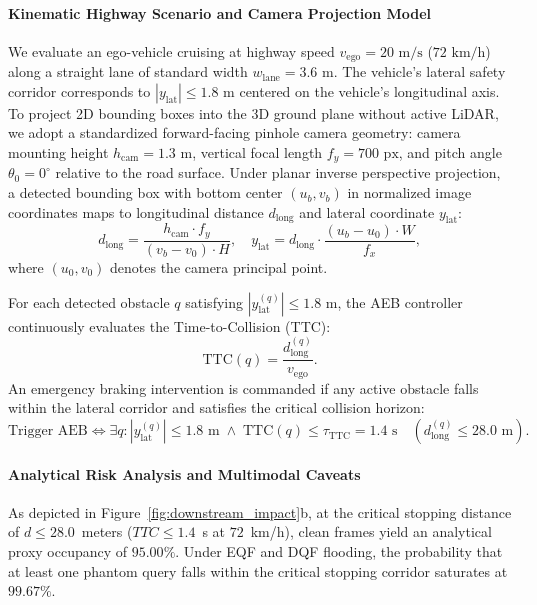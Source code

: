 \documentclass[preprint,12pt]{elsarticle}
\begin{document}
\paragraph{Kinematic Highway Scenario and Camera Projection Model}
We evaluate an ego-vehicle cruising at highway speed $v_{\mathrm{ego}} = 20\text{ m/s}$ ($72\text{ km/h}$) along a straight lane of standard width $w_{\mathrm{lane}} = 3.6\text{ m}$. The vehicle's lateral safety corridor corresponds to $|y_{\mathrm{lat}}| \le 1.8\text{ m}$ centered on the vehicle's longitudinal axis. To project 2D bounding boxes into the 3D ground plane without active LiDAR, we adopt a standardized forward-facing pinhole camera geometry: camera mounting height $h_{\mathrm{cam}} = 1.3\text{ m}$, vertical focal length $f_y = 700\text{ px}$, and pitch angle $\theta_0 = 0^\circ$ relative to the road surface. Under planar inverse perspective projection, a detected bounding box with bottom center $(u_b, v_b)$ in normalized image coordinates maps to longitudinal distance $d_{\mathrm{long}}$ and lateral coordinate $y_{\mathrm{lat}}$:
\begin{equation}
    d_{\mathrm{long}} = \frac{h_{\mathrm{cam}} \cdot f_y}{(v_b - v_0) \cdot H}, \quad y_{\mathrm{lat}} = d_{\mathrm{long}} \cdot \frac{(u_b - u_0) \cdot W}{f_x},
\end{equation}
where $(u_0, v_0)$ denotes the camera principal point.

For each detected obstacle $q$ satisfying $|y_{\mathrm{lat}}^{(q)}| \le 1.8\text{ m}$, the AEB controller continuously evaluates the Time-to-Collision (TTC):
\begin{equation}
    \mathrm{TTC}(q) = \frac{d_{\mathrm{long}}^{(q)}}{v_{\mathrm{ego}}}.
\end{equation}
An emergency braking intervention is commanded if any active obstacle falls within the lateral corridor and satisfies the critical collision horizon:
\begin{equation}
    \text{Trigger AEB} \iff \exists q : |y_{\mathrm{lat}}^{(q)}| \le 1.8\text{ m} \;\land\; \mathrm{TTC}(q) \le \tau_{\mathrm{TTC}} = 1.4\text{ s} \quad (d_{\mathrm{long}}^{(q)} \le 28.0\text{ m}).
\end{equation}

\paragraph{Analytical Risk Analysis and Multimodal Caveats}
As depicted in Figure~\ref{fig:downstream_impact}b, at the critical stopping distance of $d \le 28.0$~meters ($TTC \le 1.4$~s at $72$~km/h), clean frames yield an analytical proxy occupancy of $95.00\%$. Under EQF and DQF flooding, the probability that at least one phantom query falls within the critical stopping corridor saturates at $99.67\%$.
\end{document}
